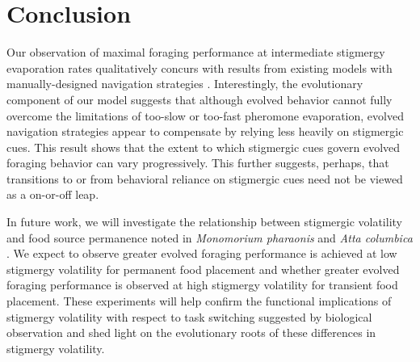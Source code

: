 \section{Conclusion}

Our observation of maximal foraging performance at intermediate stigmergy evaporation rates qualitatively concurs with results from existing models with manually-designed navigation strategies \cite{panait2004ant}.
Interestingly, the evolutionary component of our model suggests that although evolved behavior cannot fully overcome the limitations of too-slow or too-fast pheromone evaporation, evolved navigation strategies appear to compensate by relying less heavily on stigmergic cues.
This result shows that the extent to which stigmergic cues govern evolved foraging behavior can vary progressively.
This further suggests, perhaps, that transitions to or from behavioral reliance on stigmergic cues need not be viewed as a on-or-off leap.

In future work, we will investigate the relationship between stigmergic volatility and food source permanence noted in \textit{Monomorium pharaonis} and \textit{Atta columbica} \cite{jeanson_pheromone_2003, howard_costs_2001, robinson_decay_2008}.
We expect to observe greater evolved foraging performance is achieved at low stigmergy volatility for permanent food placement and whether greater evolved foraging performance is observed at high stigmergy volatility for transient food placement.
These experiments will help confirm the functional implications of stigmergy volatility with respect to task switching suggested by biological observation and shed light on the evolutionary roots of these differences in stigmergy volatility.
